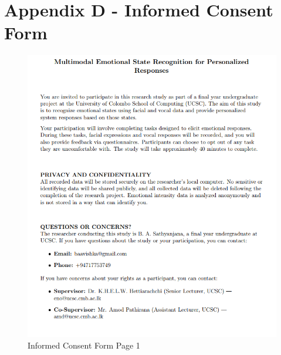 \section*{Appendix D - Informed Consent Form}
\label{sec:appendix-consent}

\begin{figure}[H]
    \centering
    \includegraphics[width=1\textwidth]{appendix/imgs/consent-pg1.png}
    \caption{Informed Consent Form Page 1}
\end{figure}


